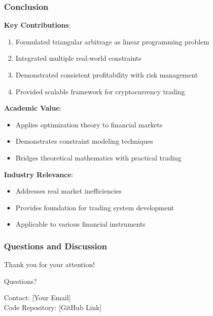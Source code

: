 \documentclass{beamer}
\begin{document}
\begin{frame}
\frametitle{Conclusion}
\textbf{Key Contributions}:
\begin{enumerate}
    \item Formulated triangular arbitrage as linear programming problem
    \item Integrated multiple real-world constraints
    \item Demonstrated consistent profitability with risk management
    \item Provided scalable framework for cryptocurrency trading
\end{enumerate}

\vspace{0.5cm}

\textbf{Academic Value}:
\begin{itemize}
    \item Applies optimization theory to financial markets
    \item Demonstrates constraint modeling techniques
    \item Bridges theoretical mathematics with practical trading
\end{itemize}

\vspace{0.5cm}

\textbf{Industry Relevance}:
\begin{itemize}
    \item Addresses real market inefficiencies
    \item Provides foundation for trading system development
    \item Applicable to various financial instruments
\end{itemize}
\end{frame}

\begin{frame}
\frametitle{Questions and Discussion}
\begin{center}
\Large Thank you for your attention!

\vspace{1cm}

Questions?

\vspace{1cm}

Contact: [Your Email]\\
Code Repository: [GitHub Link]
\end{center}
\end{frame}
\end{document}
